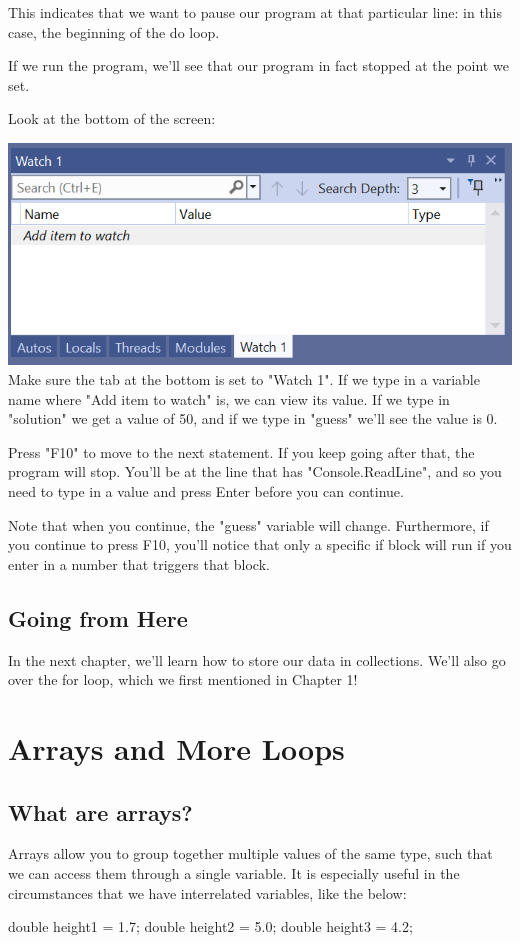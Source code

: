 \documentclass[oneside, openany] {book}
\begin{document}
This indicates that we want to pause our program at that particular line: in this case, the beginning of the do loop.

If we run the program, we'll see that our program in fact stopped at the point we set.

Look at the bottom of the screen:

\includegraphics[scale=0.5]{watch}
Make sure the tab at the bottom is set to "Watch 1".
If we type in a variable name where "Add item to watch" is, we can view its value. If we type in "solution" we get a value of 50, and if we type in "guess" we'll see the value is 0.

Press "F10" to move to the next statement. If you keep going after that, the program will stop. You'll be at the line that has "Console.ReadLine", and so you need to type in a value and press Enter before you can continue.

Note that when you continue, the "guess" variable will change. Furthermore, if you continue to press F10, you'll notice that only a specific if block will run if you enter in a number that triggers that block.
\section*{Going from Here}
In the next chapter, we'll learn how to store our data in collections. We'll also go over the for loop, which we first mentioned in Chapter 1!

\chapter{Arrays and More Loops}
\minitoc
\section{What are arrays?}
Arrays allow you to group together multiple values of the same type, such that we can access them through a single variable. It is especially useful in the circumstances that we have interrelated variables, like the below:
\begin{CSharp}
double height1 = 1.7;
double height2 = 5.0;
double height3 = 4.2;
\end{CSharp}
\end{document}
